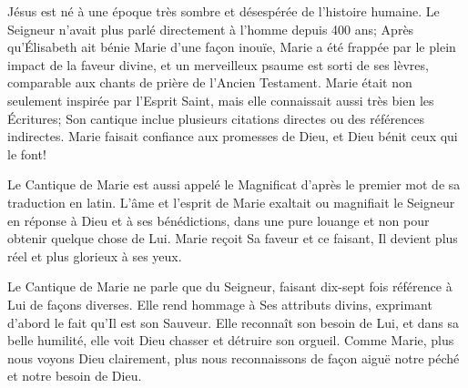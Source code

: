


Jésus est né à une époque très sombre et désespérée de l'histoire humaine. Le Seigneur n'avait plus parlé directement à l'homme depuis 400 ans; Après qu'Élisabeth ait bénie Marie d'une façon inouïe, Marie a été frappée par le plein impact de la faveur divine, et un merveilleux psaume est sorti de ses lèvres, comparable aux chants de prière de l'Ancien Testament. Marie était non seulement inspirée par l'Esprit Saint, mais elle connaissait aussi très bien les Écritures; Son cantique inclue plusieurs citations directes ou des références indirectes. Marie faisait confiance aux promesses de Dieu, et Dieu bénit ceux qui le font!

Le Cantique de Marie est aussi appelé le \og Magnificat \fg{} d'après le premier mot de sa traduction en latin. L'âme et l'esprit de Marie exaltait ou \og magnifiait \fg{} le Seigneur en réponse à Dieu et à ses bénédictions, dans une pure louange et non pour obtenir quelque chose de Lui. Marie reçoit Sa faveur et ce faisant, Il devient plus réel et plus glorieux à ses yeux.

Le Cantique de Marie ne parle que du Seigneur, faisant dix-sept fois référence à Lui de façons diverses. Elle rend hommage à Ses attributs divins, exprimant d'abord le fait qu'Il est son Sauveur. Elle reconnaît son besoin de Lui, et dans sa belle humilité, elle voit Dieu chasser et détruire son orgueil. Comme Marie, plus nous voyons Dieu clairement, plus nous reconnaissons de façon aiguë notre péché et notre besoin de Dieu.

